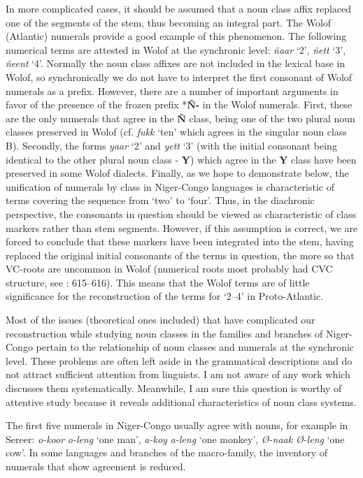 In more complicated cases, it should be assumed that a noun class affix replaced one of the segments of the stem, thus becoming an integral part. The Wolof (Atlantic) numerals provide a good example of this phenomenon. The following numerical terms are attested in Wolof at the synchronic level: \textit{ñaar} ‘2’, \textit{ñett} ‘3’, \textit{ñeent} ‘4’. Normally the noun class affixes are not included in the lexical base in Wolof, so synchronically we do not have to interpret the first consonant of Wolof numerals as a prefix. However, there are a number of important arguments in favor of the presence of the frozen prefix *\textbf{Ñ-} in the Wolof numerals. First, these are the only numerals that agree in the \textbf{Ñ} class, being one of the two plural noun classes preserved in Wolof (cf. \textit{fukk} ‘ten’ which agrees in the singular noun class B). Secondly, the forms \textit{yaar} ‘2’ and \textit{yett} ‘3’ (with the initial consonant being identical to the other plural noun class - \textbf{Y}) which agree in the \textbf{Y} class have been preserved in some Wolof dialects. Finally, as we hope to demonstrate below, the unification of numerals by class in Niger-Congo languages is characteristic of terms covering the sequence from ‘two’ to ‘four’. Thus, in the diachronic perspective, the consonants in question should be viewed as characteristic of class markers rather than stem segments. However, if this assumption is correct, we are forced to conclude that these markers have been integrated into the stem, having replaced the original initial consonants of the terms in question, the more so that VC-roots are uncommon in Wolof (numerical roots most probably had CVC structure, see \citealt{PozdniakovRobert2015}: 615--616). This means that the Wolof terms are of little significance for the reconstruction of the terms for ‘2--4’ in Proto-Atlantic.

Most of the issues (theoretical ones included) that have complicated our reconstruction while studying noun classes in the families and branches of Niger-Congo pertain to the relationship of noun classes and numerals at the synchronic level. These problems are often left aside in the grammatical descriptions and do not attract sufficient attention from linguists. I am not aware of any work which discusses them systematically. Meanwhile, I am sure this question is worthy of attentive study because it reveals additional characteristics of noun class systems. 

The first five numerals in Niger-Congo usually agree with nouns, for example in Sereer: \textit{o-koor} \textit{o-leng} ‘one man’, \textit{a-koy} \textit{a-leng} ‘one monkey’, \textit{Ø-naak} \textit{Ø-leng} ‘one cow’.  In some languages and branches of the macro-family, the inventory of numerals that show agreement is reduced. 

